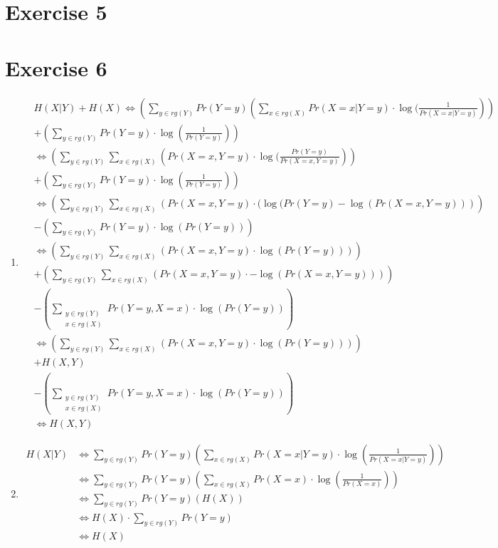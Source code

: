 \documentclass[12pt]{article}
\begin{document}
\section*{Exercise 5}

\section*{Exercise 6}
\begin{enumerate}[label=(\alph*)]
	\item	\begin{align*}
				& H(X \vert Y) + H(X) \Leftrightarrow (\sum_{y \in rg(Y)} Pr(Y=y) \left( \sum_{x \in rg(X)} Pr(X=x \vert Y=y) \cdot \log(\frac{1}{Pr(X=x \vert Y=y)} \right)) \\
				& + (\sum_{y \in rg(Y)} Pr(Y=y) \cdot \log(\frac{1}{Pr(Y=y)})) \\
				&\Leftrightarrow (\sum_{y \in rg(Y)} \sum_{x \in rg(X)} \left(  Pr(X=x, Y=y) \cdot \log(\frac{Pr(Y=y)}{Pr(X=x, Y=y)} \right)) \\
				& + (\sum_{y \in rg(Y)} Pr(Y=y) \cdot \log(\frac{1}{Pr(Y=y)})) \\
				&\Leftrightarrow (\sum_{y \in rg(Y)} \sum_{x \in rg(X)} \left( Pr(X=x, Y=y) \cdot (\log(Pr(Y=y) - \log(Pr(X=x, Y=y)) \right)) \\
				& - (\sum_{y \in rg(Y)} Pr(Y=y) \cdot \log(Pr(Y=y))) \\
				&\Leftrightarrow (\sum_{y \in rg(Y)} \sum_{x \in rg(X)} \left( Pr(X=x, Y=y) \cdot \log(Pr(Y=y)) \right)) \\
				& + (\sum_{y \in rg(Y)} \sum_{x \in rg(X)} \left( Pr(X=x, Y=y) \cdot -\log(Pr(X=x, Y=y)) \right)) \\
				& - (\sum\limits_{\substack{y \in rg(Y) \\ x \in rg(X)}} Pr(Y=y, X=x) \cdot \log(Pr(Y=y))) \\
				&\Leftrightarrow (\sum_{y \in rg(Y)} \sum_{x \in rg(X)} \left( Pr(X=x, Y=y) \cdot \log(Pr(Y=y)) \right)) \\
				& + H(X,Y) \\
				& - (\sum\limits_{\substack{y \in rg(Y) \\ x \in rg(X)}} Pr(Y=y, X=x) \cdot \log(Pr(Y=y))) \\
				&\Leftrightarrow H(X,Y)
			\end{align*}
	\item	\begin{align*}
				H(X \vert Y) &\Leftrightarrow \sum_{y \in rg(Y)} Pr(Y=y) \left( \sum_{x \in rg(X)} Pr(X=x \vert Y=y) \cdot \log(\frac{1}{Pr(X=x \vert Y=y)}) \right) \\
				&\Leftrightarrow \sum_{y \in rg(Y)} Pr(Y=y) \left( \sum_{x \in rg(X)} Pr(X=x) \cdot \log(\frac{1}{Pr(X=x)}) \right) \\
				&\Leftrightarrow \sum_{y \in rg(Y)} Pr(Y=y) \left( H(X) \right) \\
				&\Leftrightarrow H(X) \cdot \sum_{y \in rg(Y)} Pr(Y=y) \\
				&\Leftrightarrow H(X) \\
			\end{align*}
\end{enumerate}
\end{document}
